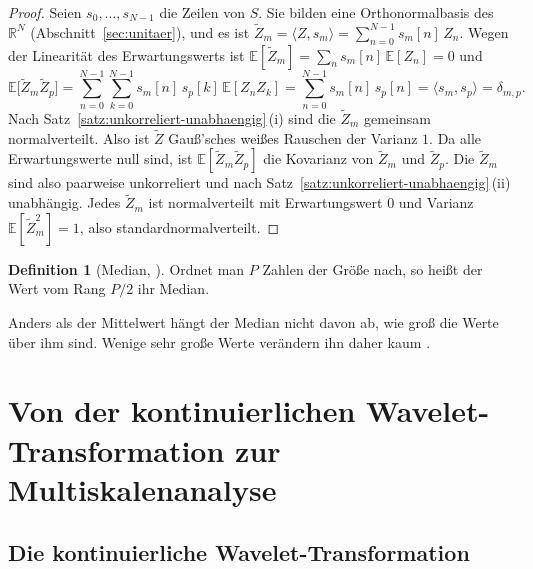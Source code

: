\documentclass[a4paper,11pt,bibliography=totoc,listof=totoc,headinclude=true,cleardoublepage=empty,oneside]{scrbook}
\theoremstyle{plain}
\theoremstyle{definition}
\newtheorem{Definition}[Satz]{Definition}
\newcommand{\R}{\mathbb{R}}
\newcommand{\scal}[2]{\langle #1, #2 \rangle}
\begin{document}
\begin{proof}
Seien $s_0,\dots,s_{N-1}$ die Zeilen von $S$. Sie bilden eine
Orthonormalbasis des $\R^N$ (Abschnitt~\ref{sec:unitaer}), und es ist
$\tilde Z_m = \scal{Z}{s_m} = \sum_{n=0}^{N-1} s_m[n]\,Z_n$. Wegen der
Linearität des Erwartungswerts ist
$\mathbb E[\tilde Z_m] = \sum_n s_m[n]\,\mathbb E[Z_n] = 0$ und
\[
  \mathbb E\bigl[\tilde Z_m\tilde Z_p\bigr]
  = \sum_{n=0}^{N-1}\sum_{k=0}^{N-1} s_m[n]\,s_p[k]\,\mathbb E[Z_nZ_k]
  = \sum_{n=0}^{N-1} s_m[n]\,s_p[n]
  = \scal{s_m}{s_p} = \delta_{m,p} .
\]
Nach Satz~\ref{satz:unkorreliert-unabhaengig}\,(i) sind die $\tilde Z_m$
gemeinsam normalverteilt. Also ist $\tilde Z$ Gau\ss'sches wei\ss es Rauschen
der Varianz $1$. Da alle Erwartungswerte null sind, ist
$\mathbb E[\tilde Z_m\tilde Z_p]$ die Kovarianz von $\tilde Z_m$ und
$\tilde Z_p$. Die $\tilde Z_m$ sind also paarweise unkorreliert und nach
Satz~\ref{satz:unkorreliert-unabhaengig}\,(ii) unabhängig. Jedes $\tilde Z_m$
ist normalverteilt \cite[Kap.~10.3.2]{mallat} %
mit Erwartungswert $0$ und Varianz $\mathbb E[\tilde Z_m^2] = 1$, also
standardnormalverteilt.
\end{proof}

\begin{Definition}[Median, {\cite[Kap.~11.3.1]{mallat}}] %
\label{def:median}
Ordnet man $P$ Zahlen der Grö\ss e nach, so hei\ss t der Wert vom Rang $P/2$
ihr Median.
\end{Definition}

Anders als der Mittelwert hängt der Median nicht davon ab, wie gro\ss{} die
Werte über ihm sind. Wenige sehr gro\ss e Werte verändern ihn daher kaum
\cite[Kap.~11.3.1]{mallat}. %

\chapter{Von der kontinuierlichen Wavelet-Transformation zur Multiskalenanalyse}
\label{chapter:mra}
 
\section{Die kontinuierliche Wavelet-Transformation}
\label{sec:cwt}
 
\end{document}
